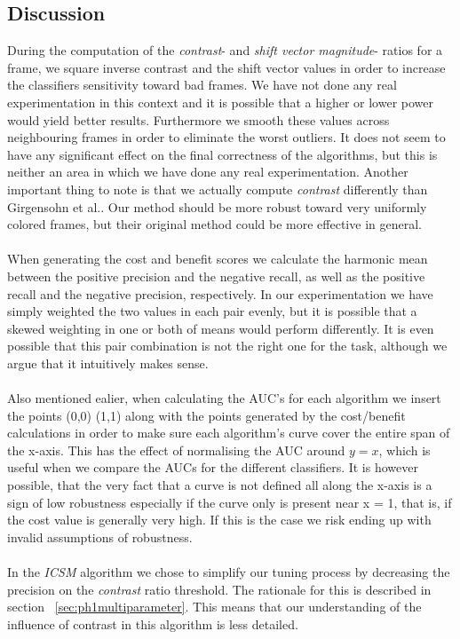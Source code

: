 \subsection{Discussion}
% 
During the computation of the \textit{contrast}- and \textit{shift vector magnitude}- ratios for a frame, we square inverse contrast and the shift vector values in order to increase the classifiers sensitivity toward bad frames. We have not done any real experimentation in this context and it is possible that a higher or lower power would yield better results. Furthermore we smooth these values across neighbouring frames in order to eliminate the worst outliers. It does not seem to have any significant effect on the final correctness of the algorithms, but this is neither an area in which we have done any real experimentation. Another important thing to note is that we actually compute \textit{contrast} differently than Girgensohn et al.\cite{Girgensohn:2000:SAH:354401.354415}. Our method should be more robust toward very uniformly colored frames, but their original method could be more effective in general.\\
\\
When generating the cost and benefit scores we calculate the harmonic mean between the positive precision and the negative recall, as well as the positive recall and the negative precision, respectively. In our experimentation we have simply weighted the two values in each pair evenly, but it is possible that a skewed weighting in one or both of means would perform differently. It is even possible that this pair combination is not the right one for the task, although we argue that it intuitively makes sense.\\
\\
Also mentioned ealier, when calculating the AUC's for each algorithm we insert the points (0,0) (1,1) along with the points generated by the cost/benefit calculations in order to make sure each algorithm's curve cover the entire span of the x-axis. This has the effect of normalising the AUC around $y = x$, which is useful when we compare the AUCs for the different classifiers. It is however possible, that the very fact that a curve is not defined all along the x-axis is a sign of low robustness especially if the curve only is present near x = 1, that is, if the cost value is generally very high. If this is the case we risk ending up with invalid assumptions of robustness.\\
\\
In the \textit{ICSM} algorithm we chose to simplify our tuning process by decreasing the precision on the \textit{contrast} ratio threshold. The rationale for this is described in section~ \ref{sec:ph1multiparameter}. This means that our understanding of the influence of contrast in this algorithm is less detailed.\\
